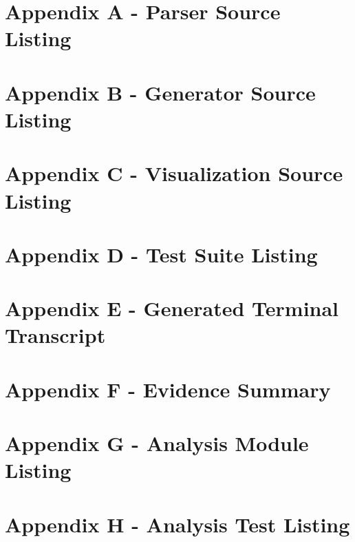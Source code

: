 \documentclass[a4paper,12pt]{article}
\begin{document}
\appendix

\section{Appendix A - Parser Source Listing}



\section{Appendix B - Generator Source Listing}



\section{Appendix C - Visualization Source Listing}



\section{Appendix D - Test Suite Listing}



\section{Appendix E - Generated Terminal Transcript}



\section{Appendix F - Evidence Summary}



\section{Appendix G - Analysis Module Listing}



\section{Appendix H - Analysis Test Listing}
\end{document}
